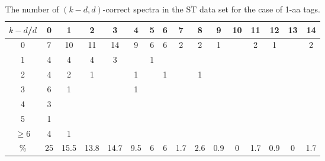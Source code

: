 \documentclass{article}[12pt]
\def\STbar{{\overline{\mathrm{ST}}}}
\begin{document}
\begin{landscape}

\begin{table}[h]\footnotesize
{\centering
\begin{tabular}{|c|c|
c|c|c|c|c|c|c|c|c|c|c|c|c|c|}
  \hline
  $k-d$/$d$ 
 & 0 & 1 & 2 & 3 & 4 & 5 & 6 & 7 & 8 & 9 & 10 & 11 & 12 & 13 & 14\\

  \hline
  \hline

0 & 7 & 10 & 11 & 14 & 9 & 6 & 6 & 2 & 2 & 1 &  & 2 & 1 &  & 2\\

1 & 4 & 4 & 4 & 3 &  & 1 &  &  &  &  &  &  &  &  & \\

2 & 4 & 2 & 1 &  & 1 &  & 1 &  & 1 &  &  &  &  &  & \\

3 & 6 & 1 &  &  & 1 &  &  &  &  &  &  &  &  &  & \\

4 & 3 &  &  &  &  &  &  &  &  &  &  &  &  &  & \\

5 & 1 &  &  &  &  &  &  &  &  &  &  &  &  &  & \\

$\ge6 $  & 4 & 1 &  &  &  &  &  &  &  &  &  &  &  &  & \\

  \hline

 \%  & 25 & 15.5 & 13.8 & 14.7 & 9.5 & 6 & 6 & 1.7 & 2.6 & 0.9 & 0 & 1.7 & 0.9 & 0 & 1.7\\

  \hline
\end{tabular}
\par}
\centering
\caption{The number of $(k-d,d)$-correct spectra in the $\STbar$ data set for the case of 1-aa tags.}
\vspace{3mm}
\label{table:kd-1-correct-ST-bar2}
\end{table}
\end{landscape}
\end{document}
